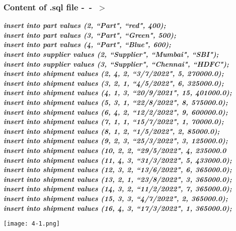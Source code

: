 \documentclass[14pt]{extarticle}
\begin{document}
\subsubsection*{Content of .sql file -\ -\ $>$}
\textbf{\textit{insert into part values (2, ``Part", ``red", 400); \\
insert into part values (3, ``Part", ``Green", 500); \\
insert into part values (4, ``Part", ``Blue", 600); \\
insert into supplier values (2, ``Supplier", ``Mumbai", ``SBI"); \\
insert into supplier values (3, ``Supplier", ``Chennai", ``HDFC"); \\
insert into shipment values (2, 4, 2, ``3/7/2022", 5, 270000.0); \\
insert into shipment values (3, 2, 1, ``4/5/2022", 6, 325000.0); \\
insert into shipment values (4, 1, 3, ``20/9/2021", 15, 401000.0); \\
insert into shipment values (5, 3, 1, ``22/8/2022", 8, 575000.0); \\
insert into shipment values (6, 4, 2, ``12/2/2022", 9, 600000.0); \\
insert into shipment values (7, 1, 1, ``15/7/2022", 1, 70000.0); \\
insert into shipment values (8, 1, 2, ``1/5/2022", 2, 85000.0); \\
insert into shipment values (9, 2, 3, ``25/3/2022", 3, 125000.0); \\
insert into shipment values (10, 2, 2, ``29/5/2022", 4, 235000.0 \\
insert into shipment values (11, 4, 3, ``31/3/2022", 5, 433000.0); \\
insert into shipment values (12, 3, 2, ``13/6/2022", 6, 365000.0); \\
insert into shipment values (13, 2, 1, ``23/8/2022", 3, 365000.0);\\
insert into shipment values (14, 3, 2, ``11/2/2022", 7, 365000.0);\\
insert into shipment values (15, 3, 3, ``4/7/2022", 2, 365000.0);\\
insert into shipment values (16, 4, 3, ``17/3/2022", 1, 365000.0);\\
}}

\begin{center}
    \texttt{[image: 4-1.png]}
\end{center}
\end{document}
